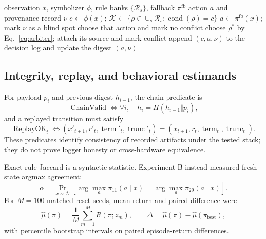 \documentclass[11pt,a4paper]{article}
\newcommand{\R}{\mathcal{R}}
\newcommand{\K}{\mathcal{K}}
\begin{document}
\begin{algorithm}[t]
\caption{Provenance-aware rule-fusion decision}
\label{alg:fusion}
\begin{algorithmic}[1]
\Require observation $x$, symbolizer $\phi$, rule banks $\{\R_s\}$, fallback $\pi^{\mathrm{fb}}$
\Ensure action $a$ and provenance record $\nu$
\State $c\gets\phi(x)$; $\K\gets\{\rho\in\cup_s\R_s:\operatorname{cond}(\rho)=c\}$
\If{$\K=\varnothing$}
  \State $a\gets\pi^{\mathrm{fb}}(x)$; mark $\nu$ as a blind spot
  \State choose that action and mark no conflict
\Else
  \State choose $\rho^*$ by Eq.~\eqref{eq:arbiter}; attach its source and mark conflict
\EndIf
\State append $(c,a,\nu)$ to the decision log and update the digest
\State \Return $(a,\nu)$
\end{algorithmic}
\end{algorithm}

\subsection{Integrity, replay, and behavioral estimands}
For payload $p_i$ and previous digest $h_{i-1}$, the chain predicate is
\begin{equation}
\operatorname{ChainValid}\iff\forall i,\quad h_i=H(h_{i-1}\Vert p_i),
\label{eq:chain}
\end{equation}
and a replayed transition must satisfy
\begin{equation}
\operatorname{ReplayOK}_t\iff(x'_{t+1},r'_t,\operatorname{term}'_t,\operatorname{trunc}'_t)
 =(x_{t+1},r_t,\operatorname{term}_t,\operatorname{trunc}_t).
\label{eq:replay}
\end{equation}
These predicates identify consistency of recorded artifacts under the tested stack; they do not prove logger honesty or cross-hardware equivalence.

Exact rule Jaccard is a syntactic statistic. Experiment B instead measured fresh-state argmax agreement:
\begin{equation}
\alpha=\Pr_{x\sim\mathcal D}
 [\arg\max_a\pi_{11}(a\mid x)=\arg\max_a\pi_{29}(a\mid x)].
\label{eq:agreement}
\end{equation}
For $M=100$ matched reset seeds, mean return and paired difference were
\begin{equation}
\hat\mu(\pi)=\frac1M\sum_{m=1}^{M}R(\pi;z_m),\qquad
\Delta=\hat\mu(\pi)-\hat\mu(\pi_{\mathrm{best}}),
\label{eq:return}
\end{equation}
with percentile bootstrap intervals on paired episode-return differences.
\end{document}
